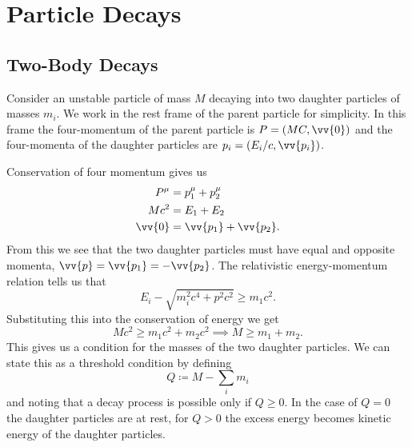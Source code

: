 \documentclass[fleqn]{NotesClass}
\begin{document}
    \chapter{Particle Decays}
    \section{Two-Body Decays}
    Consider an unstable particle of mass \(M\) decaying into two daughter particles of masses \(m_i\).
    We work in the rest frame of the parent particle for simplicity.
    In this frame the four-momentum of the parent particle is \(P = (MC, \vv{0})\) and the four-momenta of the daughter particles are \(p_i = (E_i/c, \vv{p_i})\).
    
    Conservation of four momentum gives us
    \begin{align}
        P^\mu &= p_1^\mu + p_2^\mu\\
        Mc^2 &= E_1 + E_2\\
        \vv{0} &= \vv{p_1} + \vv{p_2}.
    \end{align}
    From this we see that the two daughter particles must have equal and opposite momenta, \(\vv{p} = \vv{p_1} = -\vv{p_2}\).
    The relativistic energy-momentum relation tells us that
    \begin{equation}
        E_i - \sqrt{m_i^2c^4 + p^2c^2} \ge m_1c^2.
    \end{equation}
    Substituting this into the conservation of energy we get
    \begin{equation}
        Mc^2 \ge m_1c^2 + m_2c^2 \implies M \ge m_1 + m_2.
    \end{equation}
    This gives us a condition for the masses of the two daughter particles.
    We can state this as a threshold condition by defining
    \begin{equation}
        Q \coloneqq M - \sum_i m_i
    \end{equation}
    and noting that a decay process is possible only if \(Q \ge 0\).
    In the case of \(Q = 0\) the daughter particles are at rest, for \(Q > 0\) the excess energy becomes kinetic energy of the daughter particles.
    
\end{document}
